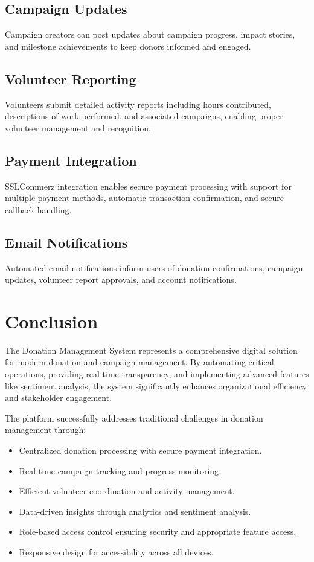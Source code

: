 \subsection{Campaign Updates}
Campaign creators can post updates about campaign progress, impact stories, and milestone achievements to keep donors informed and engaged.

\subsection{Volunteer Reporting}
Volunteers submit detailed activity reports including hours contributed, descriptions of work performed, and associated campaigns, enabling proper volunteer management and recognition.

\subsection{Payment Integration}
SSLCommerz integration enables secure payment processing with support for multiple payment methods, automatic transaction confirmation, and secure callback handling.

\subsection{Email Notifications}
Automated email notifications inform users of donation confirmations, campaign updates, volunteer report approvals, and account notifications.


\section{Conclusion}
The Donation Management System represents a comprehensive digital solution for modern donation and campaign management. By automating critical operations, providing real-time transparency, and implementing advanced features like sentiment analysis, the system significantly enhances organizational efficiency and stakeholder engagement.

The platform successfully addresses traditional challenges in donation management through:
\begin{itemize}
    \item Centralized donation processing with secure payment integration.
    \item Real-time campaign tracking and progress monitoring.
    \item Efficient volunteer coordination and activity management.
    \item Data-driven insights through analytics and sentiment analysis.
    \item Role-based access control ensuring security and appropriate feature access.
    \item Responsive design for accessibility across all devices.
\end{itemize}

